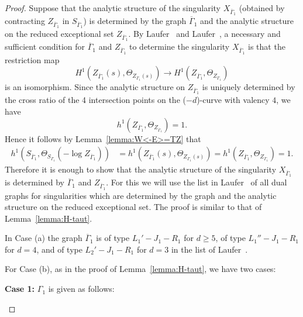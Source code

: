 \documentclass[a4paper, reqno, twoside]{amsart}
\theoremstyle{definition}
\numberwithin{equation}{section}
\begin{document}
\begin{proof}
Suppose that the analytic structure of the singularity
$X_{\overline{\Gamma}_1}$ (obtained by contracting
$Z_{\overline{\Gamma}_1}$ in $S_{\overline{\Gamma}_1}$) is determined
by the graph $\overline{\Gamma}_1$ and the analytic structure on the
reduced exceptional set $Z_{\overline{\Gamma}_1}$. By
Laufer~\cite[Theorem~3.2]{Laufer-1973-Taut} and
Laufer~\cite[(4.1)]{Laufer-1973-Taut}, a necessary and sufficient
condition for $\overline{\Gamma}_1$ and $Z_{\overline{\Gamma}_1}$ to
determine the singularity $X_{\overline{\Gamma}_1}$ is that the
restriction map
\begin{equation*}
H^1(Z_{\overline{\Gamma}_1}(s), \Theta_{Z_{\overline{\Gamma}_1}(s)}) \to H^1(Z_{\overline{\Gamma}_1}, \Theta_{Z_{\overline{\Gamma}_1}})
\end{equation*}
is an isomorphism. Since the analytic structure on
$Z_{\overline{\Gamma}_1}$ is uniquely determined by the cross ratio of
the 4 intersection points on the ($-d$)-curve with valency $4$, we
have
\[h^1(Z_{\overline{\Gamma}_1}, \Theta_{Z_{\overline{\Gamma}_1}})=1.\]
Hence it follows by Lemma~\ref{lemma:W<-E>=TZ} that
\begin{equation*}
\begin{split}
h^1(S_{\overline{\Gamma}_1}, \Theta_{S_{\overline{\Gamma}_1}}(-\log{Z_{\overline{\Gamma}_1}})) &= h^1(Z_{\overline{\Gamma}_1}(s), \Theta_{Z_{\overline{\Gamma}_1}(s)})= h^1(Z_{\overline{\Gamma}_1}, \Theta_{Z_{\overline{\Gamma}_1}})=1.
\end{split}
\end{equation*}
Therefore it is enough to show that the analytic structure of the
singularity $X_{\overline{\Gamma}_1}$ is determined by
$\overline{\Gamma}_1$ and $Z_{\overline{\Gamma}_1}$. For this we will
use the list in Laufer~\cite[Theorem~4.1]{Laufer-1973-Taut} of all
dual graphs for singularities which are determined by the graph and
the analytic structure on the reduced exceptional set. The proof is
similar to that of Lemma~\ref{lemma:H-taut}.

In Case (a) the graph $\overline{\Gamma}_1$ is of type $L_1'-J_1-R_1$
for $d \ge 5$, of type $L_1''-J_1-R_1$ for $d=4$, and of type
$L_2'-J_1-R_1$ for $d=3$ in the list of
Laufer~\cite[Theorem~4.1]{Laufer-1973-Taut}.

For Case (b), as in the proof of Lemma~\ref{lemma:H-taut}, we have two
cases:

\textbf{Case 1:} $\Gamma_1$ is given as follows:
\begin{center}
\end{center}
\end{proof}
\end{document}
